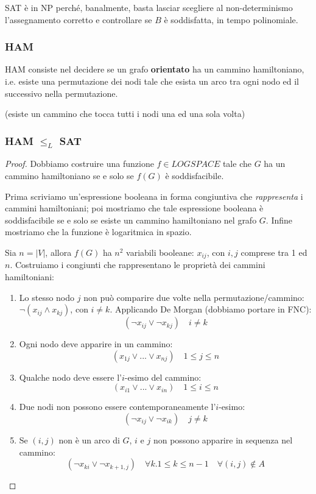 \documentclass[a4paper,10pt,oneside]{article}
\theoremstyle{break}
\begin{document}
SAT è in NP perché, banalmente, basta lasciar scegliere al non-determinismo l'assegnamento corretto e controllare se $B$ è soddisfatta, in tempo polinomiale.

\subsubsection{HAM}

HAM consiste nel decidere se un grafo \textbf{orientato} ha un cammino hamiltoniano, i.e. esiste una permutazione dei nodi tale che esista un arco tra ogni nodo ed il successivo nella permutazione.

(esiste un cammino che tocca tutti i nodi una ed una sola volta)
\newpage
\begin{mdframed}
 
\subsubsection{HAM $\leq_L$ SAT}
\begin{proof}
 
Dobbiamo costruire una funzione $f \in LOGSPACE$ tale che $G$ ha un cammino hamiltoniano se e solo se $f(G)$ è soddisfacibile.\smallskip

Prima scriviamo un'espressione booleana in forma congiuntiva che \textit{rappresenta} i cammini hamiltoniani; poi mostriamo che tale espressione booleana è soddisfacibile se e solo se esiste un cammino hamiltoniano nel grafo $G$. Infine mostriamo che la funzione è logaritmica in spazio.\medskip

Sia $n = |V|$, allora $f(G)$ ha $n^2$ variabili booleane: $x_{ij}$, con $i, j$ comprese tra 1 ed $n$. Costruiamo i congiunti che rappresentano le proprietà dei cammini hamiltoniani:

\begin{enumerate}
 \item Lo stesso nodo $j$ non può comparire due volte nella permutazione/cammino: $\neg(x_{ij} \wedge x_{kj})$, con $i \neq k$. Applicando De Morgan (dobbiamo portare in FNC):
 \[ (\neg x_{ij} \vee \neg x_{kj}) \quad i \neq k \]
 \item Ogni nodo deve apparire in un cammino:
 \[ (x_{1j} \vee ... \vee x_{nj})\quad 1 \leq j \leq n\]
 \item Qualche nodo deve essere l'$i$-esimo del cammino:
 \[ (x_{i1} \vee ... \vee x_{in})\quad 1 \leq i \leq n\]
 \item Due nodi non possono essere contemporaneamente l'$i$-esimo:
 \[ (\neg x_{ij} \vee \neg x_{ik})\quad j \neq k\]
 \item Se $(i, j)$ non è un arco di $G$, $i$ e $j$ non possono apparire in sequenza nel cammino:
 \[ (\neg x_{ki} \vee \neg x_{k+1, j}) \quad \forall k.1 \leq k \leq n-1\quad \forall (i, j) \notin A\]
\end{enumerate}


\end{proof}
\end{mdframed}
\end{document}
